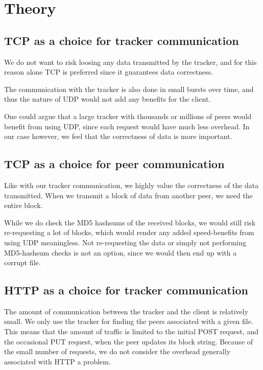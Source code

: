 \documentclass{acm_proc_article-sp}
\begin{document}
\twocolumn

\section{Theory}

\subsection{TCP as a choice for tracker communication}
We do not want to risk loosing any data transmitted by the tracker, and for this reason alone TCP is preferred since it guarantees data correctness.

The communication with the tracker is also done in small bursts over time, and thus the nature of UDP would not add any benefits for the client.

One could argue that a large tracker with thousands or millions of peers would benefit from using UDP, since each request would have much less overhead. In our case however, we feel that the correctness of data is more important.

\subsection{TCP as a choice for peer communication}
Like with our tracker communication, we highly value the correctness of the data transmitted. When we transmit a block of data from another peer, we need the entire block. 

While we do check the MD5 hashsums of the received blocks, we would still risk re-requesting a lot of blocks, which would render any added speed-benefits from using UDP meaningless.
Not re-requesting the data or simply not performing MD5-hashsum checks is not an option, since we would then end up with a corrupt file.

\subsection{HTTP as a choice for tracker communication}
The amount of communication between the tracker and the client is relatively small. We only use the tracker for finding the peers associated with a given file. This means that the amount of traffic is limited to the initial POST request, and the occasional PUT request, when the peer updates its block string. Because of the small number of requests, we do not consider the overhead generally associated with HTTP a problem.
\end{document}
